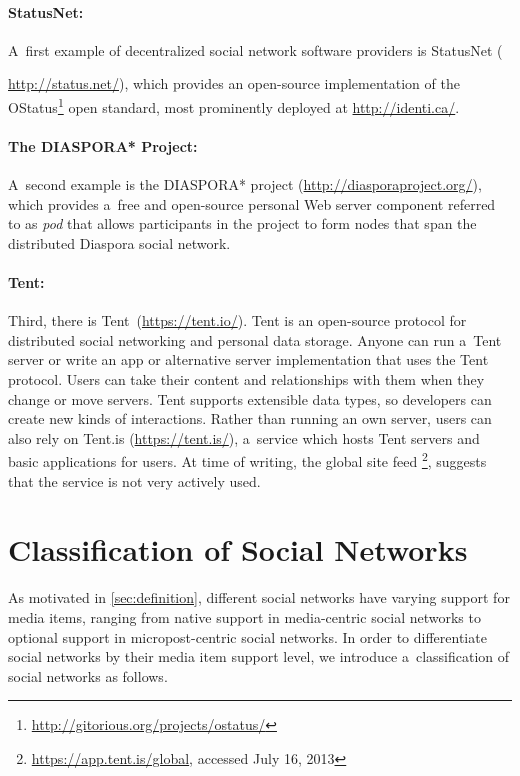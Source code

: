 \paragraph{StatusNet:}

A~first example of decentralized social network software providers
is StatusNet ({\url{http://status.net/}),
which provides an open-source implementation of the
OStatus\footnote{\url{http://gitorious.org/projects/ostatus/}}
open standard, most prominently deployed
at \url{http://identi.ca/}.

\paragraph{The DIASPORA* Project:}

A~second example is the DIASPORA* project (\url{http://diasporaproject.org/}),
which provides a~free and open-source personal Web server component
referred to as \emph{pod} that allows
participants in the project to form nodes
that span the distributed Diaspora social network.

\paragraph{Tent:}

Third, there is Tent\texttrademark~(\url{https://tent.io/}).
Tent is an open-source protocol for distributed social networking
and personal data storage.
Anyone can run a~Tent server
or write an app or alternative server implementation
that uses the Tent protocol.
Users can take their content and relationships with them
when they change or move servers.
Tent supports extensible data types,
so developers can create new kinds of interactions.
Rather than running an own server,
users can also rely on Tent.is (\url{https://tent.is/}),
a~service which hosts Tent servers
and basic applications for users.
At time of writing, the global site feed%
\footnote{\url{https://app.tent.is/global},
accessed July 16, 2013},
suggests that the service is not very actively used.

\section{Classification of Social Networks}
\label{sec:classification-of-social-networks}

As motivated in \autoref{sec:definition},
different social networks have varying support
for media items, ranging from native support
in media-centric social networks
to optional support in micropost-centric social networks.
In order to differentiate social networks by their
media item support level,
we introduce a~classification of social networks as follows.

}
